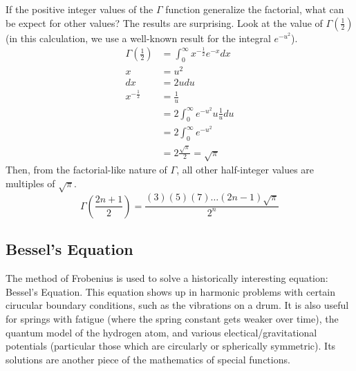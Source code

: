 \documentclass[fleqn,letterpaper]{report}
\begin{document}
If the positive integer values of the $\Gamma$ function
generalize the factorial, what can be expect for other values?
The results are surprising. Look at the value of
$\Gamma(\frac{1}{2})$ (in this calculation, we use a
well-known result for the integral $e^{-u^2}$).
\begin{align*}
\Gamma \left( \frac{1}{2} \right) & = \int_0^\infty
x^{-\frac{1}{2}} e^{-x} dx \\
x & = u^2 \\
dx & = 2u du \\
x^{-\frac{1}{2}} & = \frac{1}{u} \\
& = 2 \int_0^\infty e^{-u^2} u \frac{1}{u} du \\
& = 2 \int_0^\infty e^{-u^2} \\
& = 2 \frac{\sqrt{\pi}}{2} = \sqrt{\pi}
\end{align*}
Then, from the factorial-like nature of $\Gamma$, all
other half-integer values are multiples of $\sqrt{\pi}$.
\begin{equation*}
\Gamma\left( \frac{2n+1}{2} \right) = \frac{ (3)(5)(7) \ldots
(2n-1) \sqrt{\pi}}{2^n} 
\end{equation*}

\subsection{Bessel's Equation}
\label{bessel-equation}

The method of Frobenius is used to solve a historically
interesting equation: Bessel's Equation. This equation shows
up in harmonic problems with certain cirucular boundary
conditions, such as the vibrations on a drum. It is also
useful for springs with fatigue (where the spring constant
gets weaker over time), the quantum model of the hydrogen
atom, and various electical/gravitational potentials
(particular those which are circularly or spherically
symmetric). Its solutions are another piece of the mathematics
of special functions.
\end{document}
